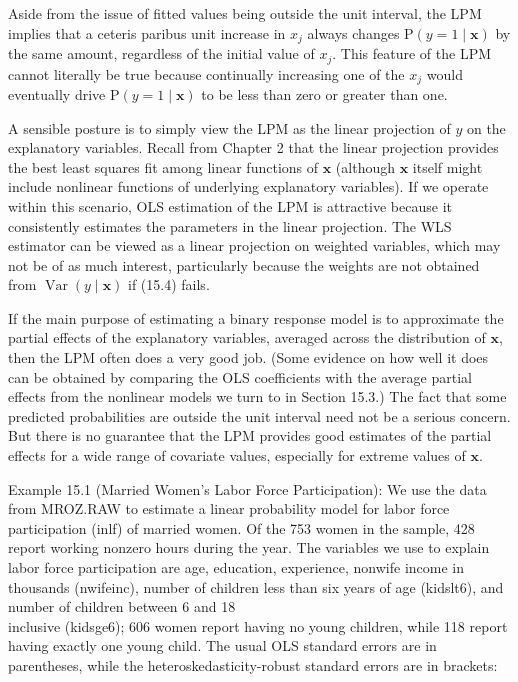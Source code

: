 \documentclass[10pt]{article}
\begin{document}
Aside from the issue of fitted values being outside the unit interval, the LPM implies that a ceteris paribus unit increase in $x_{j}$ always changes $\mathrm{P}(y=1 \mid \mathbf{x})$ by the same amount, regardless of the initial value of $x_{j}$. This feature of the LPM cannot literally be true because continually increasing one of the $x_{j}$ would eventually drive $\mathrm{P}(y=1 \mid \mathbf{x})$ to be less than zero or greater than one.

A sensible posture is to simply view the LPM as the linear projection of $y$ on the explanatory variables. Recall from Chapter 2 that the linear projection provides the best least squares fit among linear functions of $\mathbf{x}$ (although $\mathbf{x}$ itself might include nonlinear functions of underlying explanatory variables). If we operate within this scenario, OLS estimation of the LPM is attractive because it consistently estimates the parameters in the linear projection. The WLS estimator can be viewed as a linear projection on weighted variables, which may not be of as much interest, particularly because the weights are not obtained from $\operatorname{Var}(y \mid \mathbf{x})$ if (15.4) fails.

If the main purpose of estimating a binary response model is to approximate the partial effects of the explanatory variables, averaged across the distribution of $\mathbf{x}$, then the LPM often does a very good job. (Some evidence on how well it does can be obtained by comparing the OLS coefficients with the average partial effects from the nonlinear models we turn to in Section 15.3.) The fact that some predicted probabilities are outside the unit interval need not be a serious concern. But there is no guarantee that the LPM provides good estimates of the partial effects for a wide range of covariate values, especially for extreme values of $\mathbf{x}$.

Example 15.1 (Married Women's Labor Force Participation): We use the data from MROZ.RAW to estimate a linear probability model for labor force participation (inlf) of married women. Of the 753 women in the sample, 428 report working nonzero hours during the year. The variables we use to explain labor force participation are age, education, experience, nonwife income in thousands (nwifeinc), number of children less than six years of age (kidslt6), and number of children between 6 and 18\\
inclusive (kidsge6); 606 women report having no young children, while 118 report having exactly one young child. The usual OLS standard errors are in parentheses, while the heteroskedasticity-robust standard errors are in brackets:
\end{document}
